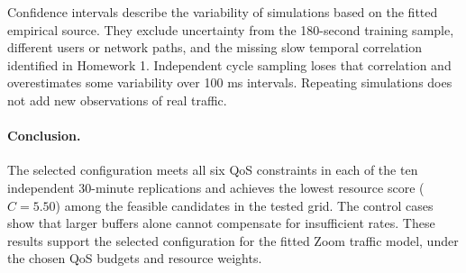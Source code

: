 \documentclass[10pt,a4paper]{article}
\begin{document}
Confidence intervals describe the variability of simulations based on the fitted
empirical source. They exclude uncertainty from the 180-second training sample,
different users or network paths, and the missing slow temporal correlation
identified in Homework 1. Independent cycle sampling loses that correlation and
overestimates some variability over 100 ms intervals. Repeating simulations does
not add new observations of real traffic.

\paragraph{Conclusion.}
The selected configuration meets all six QoS constraints in each of the ten
independent 30-minute replications and achieves the lowest resource score
($C=5.50$) among the feasible candidates in the tested grid. The control cases
show that larger buffers alone cannot compensate for insufficient rates.
These results support the selected configuration for the fitted Zoom traffic
model, under the chosen QoS budgets and resource weights.
\end{document}
